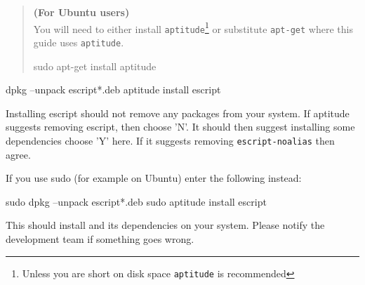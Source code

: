 \begin{verse}
\textbf{(For Ubuntu users)}\\
You will need to either install \texttt{aptitude}\footnote{Unless you are short on disk space \texttt{aptitude} is recommended} or substitute \texttt{apt-get} where this guide uses \texttt{aptitude}.
\begin{shellCode}
sudo apt-get install aptitude
\end{shellCode}
\end{verse}

\begin{shellCode}
dpkg --unpack escript*.deb
aptitude install escript
\end{shellCode}

Installing escript should not remove any packages from your system.
If aptitude suggests removing escript, then choose 'N'.
It should then suggest installing some dependencies choose 'Y' here.
If it suggests removing \texttt{escript-noalias} then agree.

If you use sudo (for example on Ubuntu) enter the following instead:
\begin{shellCode}
sudo dpkg --unpack escript*.deb
sudo aptitude install escript
\end{shellCode}

This should install \esfinley and its dependencies on your system.
Please notify the development team if something goes wrong.




